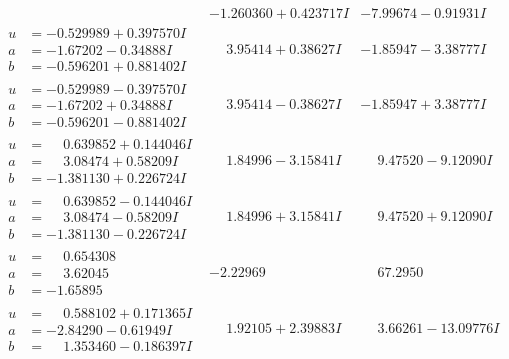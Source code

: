 \documentclass[1p]{elsarticle_modified}
\theoremstyle{definition}
\begin{document}
$$\begin{array}{c|c|c}
 & -1.260360 + 0.423717 I & -7.99674 - 0.91931 I \\ \hline\begin{aligned}
u &= -0.529989 + 0.397570 I \\
a &= -1.67202 - 0.34888 I \\
b &= -0.596201 + 0.881402 I\end{aligned}
 & \phantom{-}3.95414 + 0.38627 I & -1.85947 - 3.38777 I \\ \hline\begin{aligned}
u &= -0.529989 - 0.397570 I \\
a &= -1.67202 + 0.34888 I \\
b &= -0.596201 - 0.881402 I\end{aligned}
 & \phantom{-}3.95414 - 0.38627 I & -1.85947 + 3.38777 I \\ \hline\begin{aligned}
u &= \phantom{-}0.639852 + 0.144046 I \\
a &= \phantom{-}3.08474 + 0.58209 I \\
b &= -1.381130 + 0.226724 I\end{aligned}
 & \phantom{-}1.84996 - 3.15841 I & \phantom{-}9.47520 - 9.12090 I \\ \hline\begin{aligned}
u &= \phantom{-}0.639852 - 0.144046 I \\
a &= \phantom{-}3.08474 - 0.58209 I \\
b &= -1.381130 - 0.226724 I\end{aligned}
 & \phantom{-}1.84996 + 3.15841 I & \phantom{-}9.47520 + 9.12090 I \\ \hline\begin{aligned}
u &= \phantom{-}0.654308\phantom{ +0.000000I} \\
a &= \phantom{-}3.62045\phantom{ +0.000000I} \\
b &= -1.65895\phantom{ +0.000000I}\end{aligned}
 & -2.22969\phantom{ +0.000000I} & \phantom{-}67.2950\phantom{ +0.000000I} \\ \hline\begin{aligned}
u &= \phantom{-}0.588102 + 0.171365 I \\
a &= -2.84290 - 0.61949 I \\
b &= \phantom{-}1.353460 - 0.186397 I\end{aligned}
 & \phantom{-}1.92105 + 2.39883 I & \phantom{-}3.66261 - 13.09776 I \\ \hline\begin{aligned}

\end{aligned}
\end{array}$$
\end{document}
